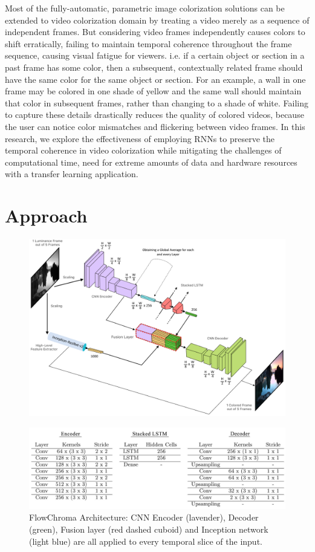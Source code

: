 \documentclass[10pt,twocolumn,letterpaper]{article}
\begin{document}
Most of the fully-automatic, parametric image colorization solutions can be extended to video colorization domain by treating a video merely as a sequence of independent frames. But considering video frames independently causes colors to shift erratically, failing to maintain temporal coherence throughout the frame sequence, causing visual fatigue for viewers. i.e. if a certain object or section in a past frame has some color, then a subsequent, contextually related frame should have the same color for the same object or section. For an example, a wall in one frame may be colored in one shade of yellow and the same wall should maintain that color in subsequent frames, rather than changing to a shade of white. Failing to capture these details drastically reduces the quality of colored videos, because the user can notice color mismatches and flickering between video frames. In this research, we explore the effectiveness of employing RNNs to preserve the temporal coherence in video colorization while mitigating the challenges of computational time, need for extreme amounts of data and hardware resources with a transfer learning application.

\section{Approach}

\begin{figure}
	\includegraphics[width=\textwidth]{flowchroma-architecture.png}
\end{figure}

\begin{figure}
	\includegraphics[width=\textwidth]{kernel-stride-table_1.jpg}
    \caption{FlowChroma Architecture: CNN Encoder (lavender), Decoder (green), Fusion layer (red dashed cuboid) and Inception network (light blue) are all applied to every temporal slice of the input.}
\end{figure}
\end{document}
